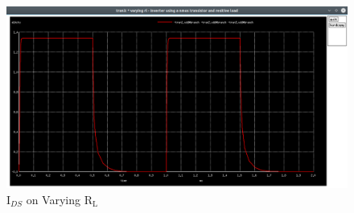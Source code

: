 \documentclass[12pt]{article}
\begin{document}
	\begin{figure}[H]
		\begin{center}
			\includegraphics[scale=0.25]{images/inverter_Rl_vdd.png}
			\caption{$\text{I}_{DS}$ on Varying $\text{R}_\text{L}$}
			\label{fig::varying_rl_vdd}
		\end{center}
	\end{figure}
	
\end{document}
